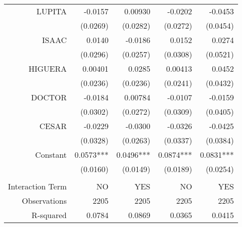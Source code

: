 \begin{tabular}{rrrrr}
LUPITA & -0.0157 & 0.00930 & -0.0202 & -0.0453 \\
      & (0.0269) & (0.0282) & (0.0272) & (0.0454) \\
ISAAC & 0.0140 & -0.0186 & 0.0152 & 0.0274 \\
      & (0.0296) & (0.0257) & (0.0308) & (0.0521) \\
HIGUERA & 0.00401 & 0.0285 & 0.00413 & 0.0452 \\
      & (0.0236) & (0.0236) & (0.0241) & (0.0432) \\
DOCTOR & -0.0184 & 0.00784 & -0.0107 & -0.0159 \\
      & (0.0302) & (0.0272) & (0.0309) & (0.0405) \\
CESAR & -0.0229 & -0.0300 & -0.0326 & -0.0425 \\
      & (0.0328) & (0.0263) & (0.0337) & (0.0384) \\
Constant  & 0.0573*** & 0.0496*** & 0.0874*** & 0.0831*** \\
      & (0.0160) & (0.0149) & (0.0189) & (0.0254) \\
      &       &       &       &  \\
Interaction Term & NO    & YES   & NO    & YES \\
Observations & 2205  & 2205  & 2205  & 2205 \\
R-squared & 0.0784 & 0.0869 & 0.0365 & 0.0415 \\
\bottomrule
\end{tabular}%
